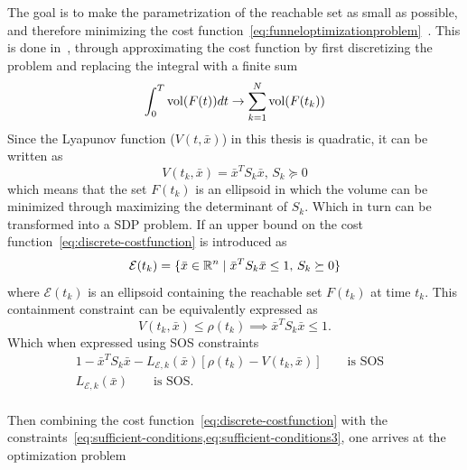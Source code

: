 The goal is to make the parametrization of the reachable set as small as
possible, and therefore minimizing the cost
function~\cref{eq:funneloptimizationproblem}~. This is done
in~\cite{majumdarFunnelLibrariesRealtime2017}, through approximating the cost
function by first discretizing the problem and replacing the integral with a
finite sum
\begin{equation}
  \int_{0}^{T} \operatorname{vol}(F(t)) dt \rightarrow \sum_{k=1}^{N} \operatorname{vol}(F(t_{k})) \label{eq:discrete-costfunction}
\end{equation}
Since the Lyapunov function (\(V(t,\bar{x})\)) in this thesis is quadratic, it
can be written as
\begin{equation}
  V(t_{k}, \bar{x}) = {\bar{x}}^{T}S_{k}\bar{x}, \, S_{k} \succeq 0
\end{equation}
which means that the set \(F(t_{k})\) is an ellipsoid in which the volume can be
minimized through maximizing the determinant of \(S_{k}\). Which in turn can be
transformed into a \ac{SDP} problem. If an upper bound on the cost
function~\cref{eq:discrete-costfunction} is introduced as
\begin{equation}
  \mathcal{E} (t_{k}) = \lbrace\bar{x} \in \mathbb{R}^n \mid {\bar{x}}^{T}S_{k}\bar{x} \leq 1, \, S_{k} \succeq 0\rbrace
\end{equation}
where \( \mathcal{E} ( t_{k} ) \) is an ellipsoid containing the reachable set
\( F ( t_{k} ) \) at time \( t_{k} \). This containment constraint can be
equivalently expressed as
\begin{equation}
  V ( t_{k}, \bar{x} ) \leq \rho(t_{k})  \implies {\bar{x}}^{T}S_{k}\bar{x} \leq 1.
\end{equation}
Which when expressed using \ac{SOS} constraints
\begin{align}
  1 - {\bar{x}}^{T}S_{k}\bar{x} - L_{\mathcal{E},k}(\bar{x})\left[ \rho(t_{k}) - V(t_{k}, \bar{x}) \right]  \qquad \text{is SOS}& \\
  L_{\mathcal{E},k}(\bar{x}) \qquad \text{is SOS.}& \\
\end{align}

Then combining the cost function~\cref{eq:discrete-costfunction} with the
constraints~\cref{eq:sufficient-conditions,eq:sufficient-conditions3},
one arrives at the optimization problem

